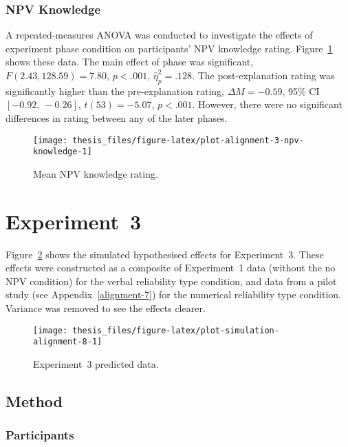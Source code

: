 \documentclass[a4paper, nobind]{templates/ociamthesis}
\theoremstyle{definition}
\theoremstyle{definition}
\theoremstyle{definition}
\theoremstyle{definition}
\theoremstyle{remark}
\begin{document}
\subsubsection{NPV Knowledge}

A repeated-measures ANOVA was conducted to investigate the effects of experiment
phase condition on participants' NPV knowledge rating.
Figure~\ref{fig:plot-alignment-3-npv-knowledge} shows these data. The main
effect of phase was significant, \(F(2.43, 128.59) = 7.80\), \(p < .001\), \(\hat{\eta}^2_p = .128\).
The post-explanation rating was significantly higher than the pre-explanation
rating,
\(\Delta M = -0.59\), 95\% CI \([-0.92,~-0.26]\), \(t(53) = -5.07\), \(p < .001\). However, there were no significant
differences in rating between any of the later phases.



\begin{figure}
\texttt{[image: thesis\_files/figure-latex/plot-alignment-3-npv-knowledge-1]} \caption{Mean NPV knowledge rating.}\label{fig:plot-alignment-3-npv-knowledge}
\end{figure}

\hypertarget{alignment-8-appendix}{%
\section{Experiment~3}\label{alignment-8-appendix}}

Figure~\ref{fig:plot-simulation-alignment-8} shows the simulated hypothesised
effects for Experiment~3. These effects were constructed as a composite of
Experiment~1 data (without the no NPV condition) for the verbal reliability type
condition, and data from a pilot study (see Appendix~\ref{alignment-7}) for the
numerical reliability type condition. Variance was removed to see the effects
clearer.



\begin{figure}
\texttt{[image: thesis\_files/figure-latex/plot-simulation-alignment-8-1]} \caption{Experiment~3 predicted data.}\label{fig:plot-simulation-alignment-8}
\end{figure}

\subsection{Method}

\subsubsection{Participants}
\end{document}
